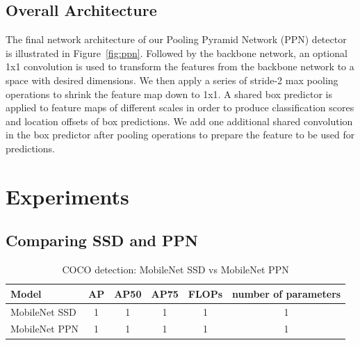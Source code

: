 \documentclass[10pt,twocolumn,letterpaper]{article}
\begin{document}

\subsection{Overall Architecture}


The final network architecture of our Pooling Pyramid
Network (PPN) detector is illustrated in
Figure~\ref{fig:ppn}.  Followed by the backbone network, an
optional 1x1 convolution is used to transform the features
from the backbone network to a space with desired
dimensions.  We then apply a series of stride-2 max pooling
operations to shrink the feature map down to 1x1.  A shared
box predictor is applied to feature maps of different scales
in order to produce classification scores and location
offsets of box predictions.  We add one additional shared
convolution in the box predictor after pooling operations to
prepare the feature to be used for predictions.


\section{Experiments}

\subsection{Comparing SSD and PPN}


\begin{table}[t]
\begin{center}
\begin{tabular}{l|c|c|c|c|c}
Model & AP & AP50 & AP75 & FLOPs & number of parameters \\
\hline
\hline
MobileNet SSD & 1 & 1 & 1 & 1 & 1 \\
\hline
MobileNet PPN & 1 & 1 & 1 & 1 & 1 \\
\end{tabular}
\end{center}
\caption{COCO detection: MobileNet SSD vs MobileNet PPN}
\end{table}


{\small


}
\end{document}

